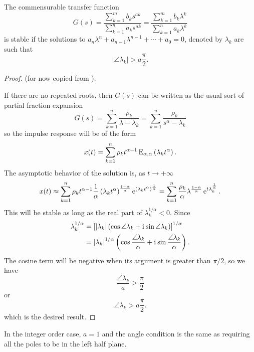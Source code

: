\begin{theorem}
  The commensurable transfer function
  \begin{equation*}
    G(s) =  \frac{\sum_{k=1}^m b_k s^{a k}}{\sum_{k=1}^n a_k s^{a k}} = 
    \frac{\sum_{k=1}^m b_k \lambda^{k}}{\sum_{k=1}^n a_k \lambda^{k}}
  \end{equation*}
  is stable if the solutions to $a_n \lambda^n + a_{n-1} \lambda^{n-1} + \cdots + a_0 = 0$, denoted by $\lambda_k$ are such that
  \begin{equation*}
    \left| \angle \lambda_k \right| > a \frac{\pi}{2}.
  \end{equation*}
  \label{th:commensurablestability}
\end{theorem}

\begin{proof}
  (for now copied from \cite{fraccontrol}).

  If there are no repeated roots, then $G(s)$ can be written as the usual sort of partial fraction expansion
  \begin{equation*}
    G(s) = \sum_{k=1}^n \frac{\rho_k}{\lambda - \lambda_k} =  \sum_{k=1}^n \frac{\rho_k}{s^\alpha - \lambda_k}
  \end{equation*}
  so the impulse response will be of the form
  \begin{equation*}
    x(t) = \sum_{k=1}^n \rho_k t^{\alpha-1} \operatorname{E}_{\alpha,\alpha} \left( \lambda_k t^\alpha \right).
  \end{equation*}
  The asymptotic behavior of the solution is, as $t \rightarrow +\infty$
  \begin{equation*}
    x(t) \approx \sum_{k=1}^n \rho_k t^{\alpha-1} \frac{1}{\alpha} \left( \lambda_k t^\alpha \right)^\frac{1-\alpha}{\alpha} \operatorname{e}^{\left( \lambda_k t^\alpha \right)^\frac{1}{\alpha}} = \sum_{k=1}^n \frac{\rho_k}{\alpha}\lambda^{\frac{1-\alpha}{\alpha}}\operatorname{e}^{t \lambda_k^\frac{1}{\alpha}}.
  \end{equation*}
  This will be stable as long as the real part of $\lambda_k^{1/\alpha} < 0$. Since
  \begin{align*}
    \lambda_k^{1/\alpha} &= \left[ \left| \lambda_k \right| \left( \cos \angle \lambda_k + \mathrm{i}\mkern1mu \sin \angle \lambda_k \right) \right]^{1/\alpha} \\
    &= \left| \lambda_k \right|^{1/\alpha} \left( \cos \frac{\angle \lambda_k}{\alpha} + \mathrm{i}\mkern1mu \sin \frac{\angle \lambda_k}{\alpha} \right).
  \end{align*}
  The cosine term will be negative when its argument is greater than $\pi/2$, so we have
  \begin{equation*}
    \frac{\angle \lambda_k}{a} > \frac{\pi}{2}
  \end{equation*}
  or
  \begin{equation*}
    \angle \lambda_k > a \frac{\pi}{2}.
  \end{equation*}
  which is the desired result.
\end{proof}

\begin{remark}
  In the integer order case, $a = 1$ and the angle condition is the same as requiring all the poles to be in the left half plane.
\end{remark}


